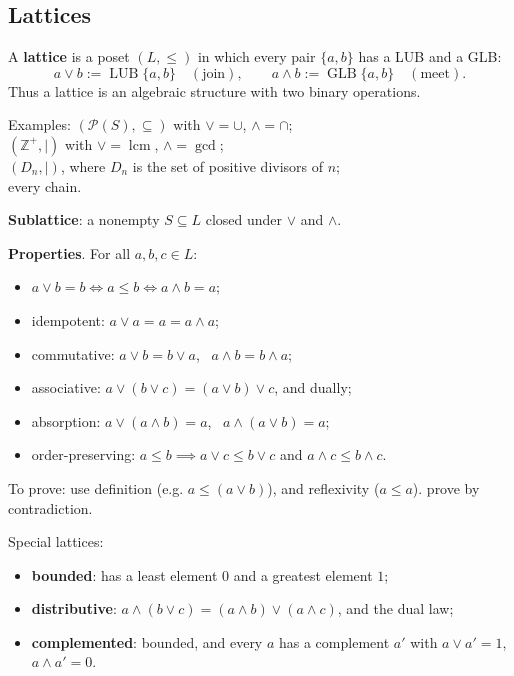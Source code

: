 \documentclass[12pt, a4paper, UTF8, openany]{ctexbook}
\newcommand{\field}[1]{\mathbb{#1}}%
\begin{document}
        \subsection{Lattices}
            A \textbf{lattice} is a poset $(L, \le)$ in which every pair $\{a, b\}$ has a LUB and a GLB:
            $$ a \vee b := \operatorname{LUB}\{a, b\} \quad (\text{join}), \qquad
               a \wedge b := \operatorname{GLB}\{a, b\} \quad (\text{meet}). $$
            Thus a lattice is an algebraic structure with two binary operations.

            Examples: $(\mathcal{P}(S), \subseteq)$ with $\vee = \cup$, $\wedge = \cap$; \\
            $(\field{Z}^+, \mid)$ with $\vee = \operatorname{lcm}$, $\wedge = \gcd$; \\
            $(D_n, \mid)$, where $D_n$ is the set of positive divisors of $n$;\\
            every chain.

            \textbf{Sublattice}: a nonempty $S \subseteq L$ closed under $\vee$ and $\wedge$.

            \textbf{Properties}. For all $a, b, c \in L$:
            \begin{itemize}
                \item $a \vee b = b \iff a \leqslant b \iff a \wedge b = a$;
                \item idempotent: $a \vee a = a = a \wedge a$;
                \item commutative: $a \vee b = b \vee a$, \ $a \wedge b = b \wedge a$;
                \item associative: $a \vee (b \vee c) = (a \vee b) \vee c$, and dually;
                \item absorption: $a \vee (a \wedge b) = a$, \ $a \wedge (a \vee b) = a$;
                \item order-preserving: $a \leqslant b \implies a \vee c \leqslant b \vee c$ and $a \wedge c \leqslant b \wedge c$.
            \end{itemize}

            To prove: use definition (e.g. $a \leqslant (a \vee b)$), and reflexivity ($a \leqslant a$). prove by contradiction.

            Special lattices:
            \begin{itemize}
                \item \textbf{bounded}: has a least element $0$ and a greatest element $1$;
                \item \textbf{distributive}: $a \wedge (b \vee c) = (a \wedge b) \vee (a \wedge c)$, and the dual law;
                \item \textbf{complemented}: bounded, and every $a$ has a complement $a'$ with $a \vee a' = 1$, $a \wedge a' = 0$.
            \end{itemize}
\end{document}

